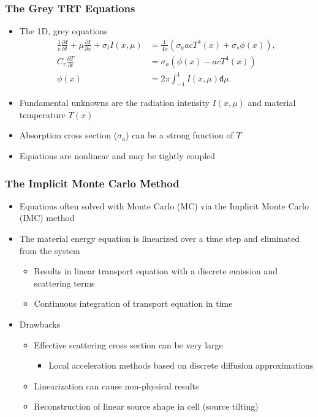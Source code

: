 \documentclass[xcolor=dvipsnames,hyperref={pdfpagelabels=false},unknownkeysallowed]{beamer}
\newlength{\wideitemsep}
\let\olditem\item
\renewcommand{\item}{\setlength{\itemsep}{\wideitemsep}\olditem}
\newcommand{\pderiv}[2]{\frac{\partial #1}{\partial #2}}
\renewcommand{\d}{\mathsf{d}}
\begin{document}
\begin{frame}
\frametitle{The Grey TRT Equations}
\begin{itemize}
\item The 1D, grey equations
\begin{align*}\label{ho_cont}
    \frac{1}{c}\pderiv{I}{t} + \mu \pderiv{I}{x} + \sigma_t I(x,\mu)
    &= \frac{1}{4\pi} \left( \sigma_a a c T^4(x) + \sigma_s \phi(x)\right),
  \\
  C_v \pderiv{T}{t} &=  \sigma_a \left(\phi(x) - a c T^4(x)\right) \\
   \phi(x) &= 2\pi\int_{-1}^1 I(x,\mu) \d \mu.
\end{align*}
        \item Fundamental unknowns are the radiation intensity $I(x,\mu)$ and material
            temperature $T(x)$
        \item Absorption cross section ($\sigma_a$) can be a strong function of $T$
        \item Equations are nonlinear and may be tightly coupled 
\end{itemize}

\end{frame}

\begin{frame}
\frametitle{The Implicit Monte Carlo Method}
\begin{itemize}
\item Equations often solved with Monte Carlo (MC) via the Implicit Monte Carlo (IMC) method
\item The material energy equation is linearized over a time step and eliminated from the system
    \begin{itemize}
        \item Results in linear transport equation with a discrete emission and scattering terms
\item Continuous integration of transport equation in time
    \end{itemize}
    \pause
\item Drawbacks 
\begin{itemize}
\item Effective scattering cross section can be very large 
    \begin{itemize}
        \item Local acceleration methods based on discrete diffusion approximations
    \end{itemize}
\item Linearization can cause non-physical results
\item Reconstruction of linear source shape in cell (source tilting)
\end{itemize}
\end{itemize}
\end{frame}
\end{document}
